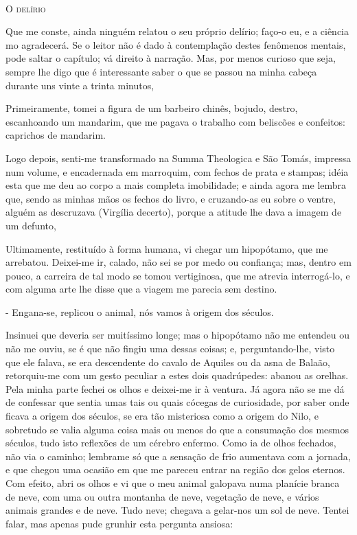 \begin{corollary}
\\
\textsc{O delírio}

Que me conste, ainda ninguém relatou o seu próprio delírio; faço-o eu, e a ciência mo agradecerá. Se o leitor não é dado à contemplação destes fenômenos mentais, pode saltar o capítulo; vá direito à narração. Mas, por menos curioso que seja, sempre lhe digo que é interessante saber o que se passou na minha cabeça durante uns vinte a trinta minutos,

Primeiramente, tomei a figura de um barbeiro chinês, bojudo, destro, escanhoando um mandarim, que me pagava o trabalho com beliscões e confeitos: caprichos de mandarim.

Logo depois, senti-me transformado na Summa Theologica e São Tomás, impressa num volume, e encadernada em
 marroquim, com fechos de prata e stampas; idéia esta que me deu ao corpo a mais completa imobilidade; e ainda agora me lembra que, sendo as minhas mãos os fechos do livro, e cruzando-as eu sobre o ventre, alguém as descruzava (Virgília decerto), porque a atitude lhe dava a imagem de um defunto,

Ultimamente, restituído à forma humana, vi chegar um hipopótamo, que me arrebatou. Deixei-me ir, calado, não sei se por medo ou confiança; mas, dentro em pouco, a carreira de tal modo se tomou vertiginosa, que me atrevia interrogá-lo, e com alguma arte lhe disse que a viagem me parecia sem destino.

- Engana-se, replicou o animal, nós vamos à origem dos séculos.

Insinuei que deveria ser muitíssimo longe; mas o hipopótamo não me entendeu ou não me ouviu, se é que não fingiu uma dessas coisas; e, perguntando-lhe, visto que ele falava, se era descendente do cavalo de Aquiles ou da asna de Balaão, retorquiu-me com um gesto peculiar a estes dois quadrúpedes: abanou as orelhas. Pela minha parte fechei os olhos e deixei-me ir à ventura. Já agora não se me dá de confessar que sentia umas tais ou quais cócegas de curiosidade, por saber onde ficava a origem dos séculos, se era tão misteriosa como a origem do Nilo, e sobretudo se valia alguma coisa mais ou menos do que a consumação dos mesmos séculos, tudo isto reflexões de um cérebro enfermo. Como ia de olhos fechados, não via o caminho; lembrame só que a sensação de frio aumentava com a jornada, e que chegou uma ocasião em que me pareceu entrar na região dos gelos eternos. Com efeito, abri os olhos e vi que o meu animal galopava numa planície branca de neve, com uma ou outra montanha de neve, vegetação de neve, e vários animais grandes e de neve. Tudo neve; chegava a gelar-nos um sol de neve. Tentei falar, mas apenas pude grunhir esta pergunta ansiosa:


\end{corollary}
